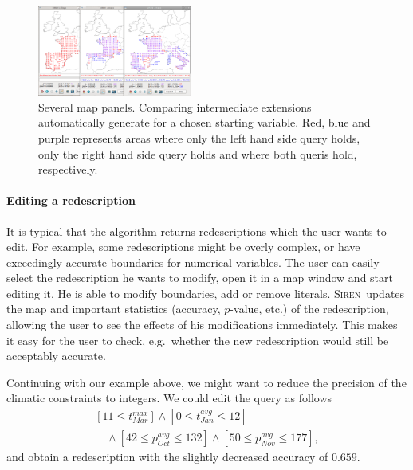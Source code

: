 \documentclass{sig-alternate}
\newcommand{\prg}[1]{\paragraph{#1}}
\newcommand{\Siren}{\textsc{Siren}}
\begin{document}

\begin{figure}
  \centering
\includegraphics[width=0.45\textwidth]{screenshots/comparison.png}
  \caption{Several map panels. Comparing intermediate extensions automatically generate for a chosen starting variable. Red, blue and purple represents areas where only the left hand side query holds, only the right hand side query holds and where both queris hold, respectively.}
  \label{fig:comparison}
\end{figure}

\prg{Editing a redescription} 
It is typical that the algorithm returns redescriptions which the user
wants to edit. For example, some redescriptions might be overly
complex, or have exceedingly accurate boundaries for numerical
variables. The user can easily select the redescription he wants to
modify, open it in a map window and start editing it. He is able to
modify boundaries, add or remove literals. \Siren\ updates the map and
important statistics (accuracy, $p$-value, etc.) of the redescription,
allowing the user to see the effects of his modifications
immediately. This makes it easy for the user to check, e.g.\ whether
the new redescription would still be acceptably accurate.

Continuing with our example above, we might want to reduce the precision of the climatic constraints to integers. We could edit the query as follows
\begin{equation*}
\begin{array}{l}
[11 \leq t_{Mar}^{max}] \land  [0 \leq t_{Jan}^{avg} \leq 12]\\[1mm]
\quad\land  [42 \leq p_{Oct}^{avg} \leq 132] \land [50 \leq p_{Nov}^{avg} \leq 177],
\end{array}
\end{equation*}
and obtain a redescription with the slightly decreased accuracy of $0.659$.
\end{document}

